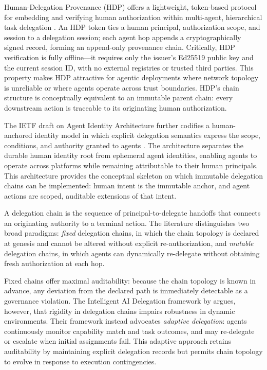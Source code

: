 Human-Delegation Provenance (HDP) offers a lightweight, token-based protocol for embedding and verifying human authorization within multi-agent, hierarchical task delegation \cite{hdp2025}. An HDP token ties a human principal, authorization scope, and session to a delegation session; each agent hop appends a cryptographically signed record, forming an append-only provenance chain. Critically, HDP verification is fully offline---it requires only the issuer's Ed25519 public key and the current session ID, with no external registries or trusted third parties. This property makes HDP attractive for agentic deployments where network topology is unreliable or where agents operate across trust boundaries. HDP's chain structure is conceptually equivalent to an immutable parent chain: every downstream action is traceable to its originating human authorization.

The IETF draft on Agent Identity Architecture further codifies a human-anchored identity model in which explicit delegation semantics express the scope, conditions, and authority granted to agents \cite{beyer2025agentidentity}. The architecture separates the durable human identity root from ephemeral agent identities, enabling agents to operate across platforms while remaining attributable to their human principals. This architecture provides the conceptual skeleton on which immutable delegation chains can be implemented: human intent is the immutable anchor, and agent actions are scoped, auditable extensions of that intent.


A delegation chain is the sequence of principal-to-delegate handoffs that connects an originating authority to a terminal action. The literature distinguishes two broad paradigms: \emph{fixed} delegation chains, in which the chain topology is declared at genesis and cannot be altered without explicit re-authorization, and \emph{mutable} delegation chains, in which agents can dynamically re-delegate without obtaining fresh authorization at each hop.

Fixed chains offer maximal auditability: because the chain topology is known in advance, any deviation from the declared path is immediately detectable as a governance violation. The Intelligent AI Delegation framework by \cite{tomasev2026intelligent} argues, however, that rigidity in delegation chains impairs robustness in dynamic environments. Their framework instead advocates \emph{adaptive delegation}: agents continuously monitor capability match and task outcomes, and may re-delegate or escalate when initial assignments fail. This adaptive approach retains auditability by maintaining explicit delegation records but permits chain topology to evolve in response to execution contingencies.

